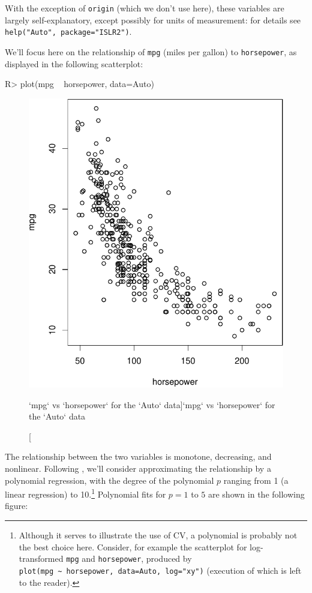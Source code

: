 \documentclass[
]{jss}
\begin{document}
With the exception of \texttt{origin} (which we don't use here), these
variables are largely self-explanatory, except possibly for units of
measurement: for details see \texttt{help("Auto",\ package="ISLR2")}.

We'll focus here on the relationship of \texttt{mpg} (miles per gallon)
to \texttt{horsepower}, as displayed in the following scatterplot:

\begin{CodeChunk}
\begin{CodeInput}
R> plot(mpg ~ horsepower, data=Auto)
\end{CodeInput}
\begin{figure}

{\centering \includegraphics[width=1\linewidth]{JSS-article_files/figure-latex/mpg-horsepower-scatterplot-1} 

}

\caption[`mpg` vs `horsepower` for the `Auto` data]{`mpg` vs `horsepower` for the `Auto` data}\label{fig:mpg-horsepower-scatterplot}
\end{figure}
\end{CodeChunk}

The relationship between the two variables is monotone, decreasing, and
nonlinear. Following \citet{JamesEtAl:2021}, we'll consider
approximating the relationship by a polynomial regression, with the
degree of the polynomial \(p\) ranging from 1 (a linear regression) to
10.\footnote{Although it serves to illustrate the use of CV, a
  polynomial is probably not the best choice here. Consider, for example
  the scatterplot for log-transformed \texttt{mpg} and
  \texttt{horsepower}, produced by
  \texttt{plot(mpg\ \textasciitilde{}\ horsepower,\ data=Auto,\ log="xy")}
  (execution of which is left to the reader).} Polynomial fits for
\(p = 1\) to \(5\) are shown in the following figure:
\end{document}

